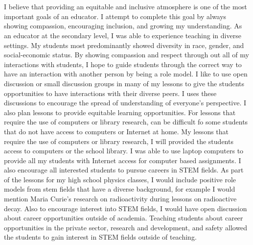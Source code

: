 \documentclass[12pt,letterpaper]{article}
\begin{document}
\\

\paragraph{}I believe that providing an equitable and inclusive atmosphere is one of the most important goals of an educator. I attempt to complete this goal by always showing compassion, encouraging inclusion, and growing my understanding. As an educator at the secondary level, I was able to experience teaching in diverse settings. My students most predominantly showed diversity in race, gender, and social-economic status. By showing compassion and respect through out all of my interactions with students, I hope to guide students through the correct way to have an interaction with another person by being a role model.  I like to use open discussion or small discussion groups in many of my lessons to give the students opportunities to have interactions with their diverse peers. I uses these discussions to encourage the spread of understanding of everyone's perspective. I also plan lessons to provide equitable learning opportunities. For lessons that require the use of computers or library research, can be difficult fo some students that do not have access to computers or Internet at home. My lessons that require the use of computers or library research, I will provided the students access to computers or the school library. I was able to use laptop computers to provide all my students with Internet access for computer based assignments. I also encourage all interested students to pursue careers in STEM fields. As part of the lessons for my high school physics classes, I would include positive role models from stem fields that have a diverse background, for example I would mention Maria Curie's research on radioactivity during lessons on radioactive decay. Also to encourage interest into STEM fields, I would have open discussion about career opportunities outside of academia. Teaching students about career opportunities in the private sector, research and development, and safety allowed the students to gain interest in STEM fields outside of teaching. 
\end{document}
